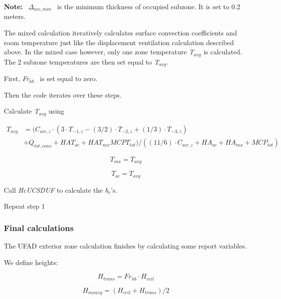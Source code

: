 \textbf{Note:} ~\({\Delta_{occ,min}}\) ~is the minimum thickness of occupied subzone. It is set to 0.2 meters.

The mixed calculation iteratively calculates surface convection coefficients and room temperature just like the displacement ventilation calculation described above. In the mixed case however, only one zone temperature \emph{T\(_{avg}\)} is calculated. The 2 subzone temperatures are then set equal to \emph{T\(_{avg}\)}.

First, \emph{Fr\(_{hb}\)}~ is set equal to zero.

Then the code iterates over these steps.

Calculate \emph{T\(_{avg}\)} using

\begin{equation}
  \begin{array}{rl}
    T_{avg} &= ({C_{air,z}} \cdot (3 \cdot {T_{ - 1,z}} - (3/2) \cdot {T_{ - 2,z}} + (1/3) \cdot {T_{ - 3,z}}) \\
            &+ {{\dot Q}_{tot,conv}} + HA{T_{oc}} + HA{T_{mx}}MCP{T_{tot}})/((11/6) \cdot {C_{air,z}} + H{A_{oc}} + H{A_{mx}} + MC{P_{tot}})
  \end{array}
\end{equation}

\begin{equation}
{T_{mx}} = {T_{avg}}
\end{equation}

\begin{equation}
{T_{oc}} = {T_{avg}}
\end{equation}

Call \emph{HcUCSDUF} to calculate the \emph{h\(_{c}\)}'s.

Repeat step 1

\subsubsection{Final calculations}\label{final-calculations-2}

The UFAD exterior zone calculation finishes by calculating some report variables.

We define heights:

\begin{equation}
{H_{trans}} = F{r_{hb}} \cdot {H_{ceil}}
\end{equation}

\begin{equation}
{H_{mxavg}} = \left( {{H_{ceil}} + {H_{trans}}} \right)/2
\end{equation}

